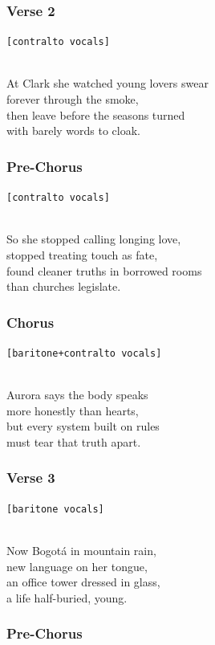 \subsubsection{Verse 2}\label{verse-2-6}

\texttt{{[}contralto\ vocals{]}}\strut \\
At Clark she watched young lovers swear\\
forever through the smoke,\\
then leave before the seasons turned\\
with barely words to cloak.

\subsubsection{Pre-Chorus}\label{pre-chorus-11}

\texttt{{[}contralto\ vocals{]}}\strut \\
So she stopped calling longing love,\\
stopped treating touch as fate,\\
found cleaner truths in borrowed rooms\\
than churches legislate.

\subsubsection{Chorus}\label{chorus-21}

\texttt{{[}baritone+contralto\ vocals{]}}\strut \\
Aurora says the body speaks\\
more honestly than hearts,\\
but every system built on rules\\
must tear that truth apart.

\subsubsection{Verse 3}\label{verse-3-3}

\texttt{{[}baritone\ vocals{]}}\strut \\
Now Bogotá in mountain rain,\\
new language on her tongue,\\
an office tower dressed in glass,\\
a life half-buried, young.

\subsubsection{Pre-Chorus}\label{pre-chorus-12}

